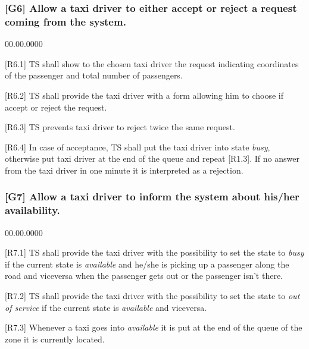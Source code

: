 \subsubsection{{[}G6{]} Allow a taxi driver to either accept or reject a request
coming from the system.}
\begin{lyxlist}{00.00.0000}
\item [{{[}R6.1{]}}] TS shall show to the chosen taxi driver the request
indicating coordinates of the passenger and total number of passengers.
\item [{{[}R6.2{]}}] TS shall provide the taxi driver with a form allowing
him to choose if accept or reject the request.
\item [{{[}R6.3{]}}] TS prevents taxi driver to reject twice the same request.
\item [{{[}R6.4{]}}] In case of acceptance, TS shall put the taxi driver
into state \emph{busy}, otherwise put taxi driver at the end of the
queue and repeat {[}R1.3{]}. If no answer from the taxi driver in
one minute it is interpreted as a rejection.
\end{lyxlist}

\subsubsection{{[}G7{]} Allow a taxi driver to inform the system about his/her availability.}
\begin{lyxlist}{00.00.0000}
\item [{{[}R7.1{]}}] TS shall provide the taxi driver with the possibility
to set the state to \emph{busy} if the current state is \emph{available}
and he/she is picking up a passenger along the road and viceversa
when the passenger gets out or the passenger isn't there.
\item [{{[}R7.2{]}}] TS shall provide the taxi driver with the possibility
to set the state to \emph{out of service} if the current state is
\emph{available} and viceversa.
\item [{{[}R7.3{]}}] Whenever a taxi goes into \emph{available} it is put
at the end of the queue of the zone it is currently located.
\end{lyxlist}

